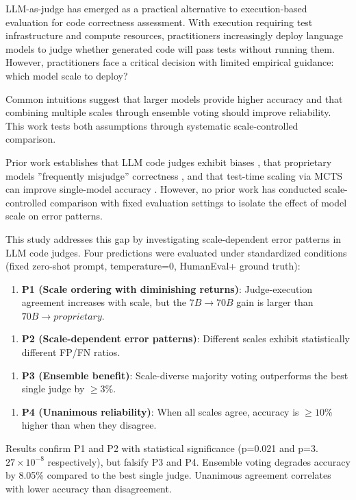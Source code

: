
LLM-as-judge has emerged as a practical alternative to execution-based evaluation for code correctness assessment. With execution requiring test infrastructure and compute resources, practitioners increasingly deploy language models to judge whether generated code will pass tests without running them. However, practitioners face a critical decision with limited empirical guidance: which model scale to deploy?

Common intuitions suggest that larger models provide higher accuracy and that combining multiple scales through ensemble voting should improve reliability. This work tests both assumptions through systematic scale-controlled comparison.

Prior work establishes that LLM code judges exhibit biases \citep{moon2025biases}, that proprietary models ''frequently misjudge'' correctness \citep{crupi2025effectiveness}, and that test-time scaling via MCTS can improve single-model accuracy \citep{wang2025mctsjudge}. However, no prior work has conducted scale-controlled comparison with fixed evaluation settings to isolate the effect of model scale on error patterns.

This study addresses this gap by investigating scale-dependent error patterns in LLM code judges. Four predictions were evaluated under standardized conditions (fixed zero-shot prompt, temperature=0, HumanEval+ ground truth):

\begin{enumerate}
\item \textbf{P1 (Scale ordering with diminishing returns)}: Judge-execution agreement increases with scale, but the $7B\rightarrow 70B$ gain is larger than $70B\rightarrow proprietary$.
\end{enumerate}

\begin{enumerate}
\item \textbf{P2 (Scale-dependent error patterns)}: Different scales exhibit statistically different FP/FN ratios.
\end{enumerate}

\begin{enumerate}
\item \textbf{P3 (Ensemble benefit)}: Scale-diverse majority voting outperforms the best single judge by $\geq 3$\%.
\end{enumerate}

\begin{enumerate}
\item \textbf{P4 (Unanimous reliability)}: When all scales agree, accuracy is $\geq 10$\% higher than when they disagree.
\end{enumerate}

Results confirm P1 and P2 with statistical significance (p=0.021 and p=3.$27\times 10^{-8}$ respectively), but falsify P3 and P4. Ensemble voting degrades accuracy by 8.05\% compared to the best single judge. Unanimous agreement correlates with lower accuracy than disagreement.

